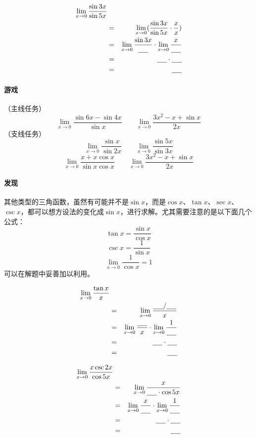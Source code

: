 \documentclass[UTF8]{ctexart}
\begin{document}
\begin{eqnarray*}
{\lim_{x \to 0} \frac{\sin{3x}}{\sin{5x}}}\\
& = & {\lim_{x \to 0} (\frac{\sin{3x}}{\sin{5x}} \cdot \frac{x}{x})}\\
& = & {\lim_{x \to 0} \frac{\sin{3x}}{\underline{\hbox to 5mm{}}}} \cdot {\lim_{x \to 0} \frac{x}{\underline{\hbox to 5mm{}}}}\\
& = & \underline{\hbox to 5mm{}} \cdot \underline{\hbox to 5mm{}}\\
& = & \underline{\hbox to 5mm{}}
\end{eqnarray*}

\paragraph{游戏}
（主线任务）
\[ {\lim_{x \to 0} \frac{\sin{6x} - \sin{4x}}{\sin{x}}}   \qquad {\lim_{x \to 0} \frac{3x^2-x+\sin{x}}{2x}}\]
（支线任务）
\[ {\lim_{x \to 0} \frac{\sin{x}}{\sin{2x}}}   \qquad {\lim_{x \to 0} \frac{\sin{5x}}{\sin{3x}}}\]
\[ {\lim_{x \to 0} \frac{x+x\cos{x}}{\sin{x}\cos{x}}}   \qquad {\lim_{x \to 0} \frac{3x^2-x+\sin{x}}{2x}}\]

\paragraph{发现}
其他类型的三角函数，虽然有可能并不是$\sin{x}$，而是$\cos{x}$、$\tan{x}$、$\sec{x}$、$\csc{x}$，都可以想方设法的变化成$\sin{x}$，进行求解。尤其需要注意的是以下面几个公式：
\[\tan{x} = \frac{\sin{x}}{\cos{x}}\]
\[\csc{x} = \frac{1}{\sin{x}}\]
\[{\lim_{x \to 0} \frac{1}{\cos{x}}} = 1\]
可以在解题中妥善加以利用。

\begin{eqnarray*}
{\lim_{x \to 0} \frac{\tan{x}}{x}}\\
& = & {\lim_{x \to 0} \frac{\underline{\hbox to 5mm{}}/\underline{\hbox to 5mm{}}}{x}}\\
& = & {\lim_{x \to 0} \frac{\underline{\hbox to 5mm{}}}{x}} \cdot {\lim_{x \to 0} \frac{1}{\underline{\hbox to 5mm{}}}}\\
& = & \underline{\hbox to 5mm{}} \cdot \underline{\hbox to 5mm{}}\\
& = & \underline{\hbox to 5mm{}}
\end{eqnarray*}

\begin{eqnarray*}
{\lim_{x \to 0} \frac{x\csc{2x}}{\cos{5x}}}\\
& = & {\lim_{x \to 0} \frac{x}{\underline{\hbox to 5mm{}} \cdot \cos{5x}}}\\
& = & {\lim_{x \to 0} \frac{x}{\underline{\hbox to 5mm{}}}} \cdot {\lim_{x \to 0} \frac{1}{\underline{\hbox to 5mm{}}}}\\
& = & \underline{\hbox to 5mm{}} \cdot \underline{\hbox to 5mm{}}\\
& = & \underline{\hbox to 5mm{}}
\end{eqnarray*}
\end{document}
